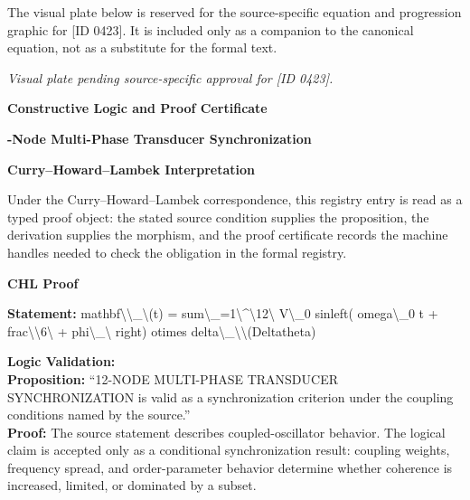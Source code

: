 \begingroup\footnotesize\sloppy
The visual plate below is reserved for the source-specific equation and progression graphic for [ID 0423]. It is included only as a companion to the canonical equation, not as a substitute for the formal text.
\par\endgroup
\begingroup\footnotesize\itshape
Visual plate pending source-specific approval for [ID 0423].
\par\endgroup

\clearpage
\begingroup\tzpsupportsetup
\noindent\textbf{\fontsize{10.8pt}{12.8pt}\selectfont [ID 0423] Constructive Logic and Proof Certificate}\par
\noindent\textbf{\fontsize{10pt}{12pt}-Node Multi-Phase Transducer Synchronization}\par
\vspace{0.45em}
\begingroup
\footnotesize
\setlength{\parskip}{0.22em}
\setlength{\parindent}{0pt}
\noindent\textbf{Curry--Howard--Lambek Interpretation}\par
Under the Curry--Howard--Lambek correspondence, this registry entry is read as a typed proof
object: the stated source condition supplies the proposition, the derivation supplies the
morphism, and the proof certificate records the machine handles needed to check the obligation
in the formal registry.

\vspace{0.45em}
\noindent\textbf{CHL Proof}\par
\textbf{Statement:} mathbf\textbackslash{}\textbackslash{}\_\textbackslash{}(t) = sum\textbackslash{}\_=1\textbackslash{}\textasciicircum{}\textbackslash{}12\textbackslash{} V\textbackslash{}\_0 sinleft( omega\textbackslash{}\_0 t + frac\textbackslash{}\textbackslash{}6\textbackslash{} + phi\textbackslash{}\_\textbackslash{} right) otimes
delta\textbackslash{}\_\textbackslash{}\textbackslash{}(Deltatheta)

\textbf{Logic Validation:}\\
\textbf{Proposition:} ``12-NODE MULTI-PHASE TRANSDUCER SYNCHRONIZATION is valid as a synchronization criterion
under the coupling conditions named by the source.''\\
\textbf{Proof:} The source statement describes coupled-oscillator behavior. The logical claim is
accepted only as a conditional synchronization result: coupling weights, frequency
spread, and order-parameter behavior determine whether coherence is increased, limited,
or dominated by a subset.


